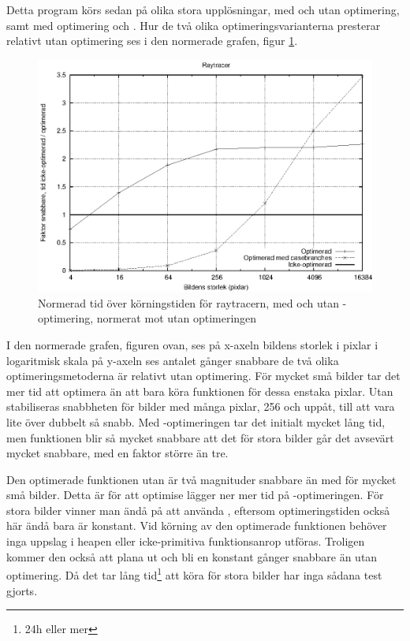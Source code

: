 \documentclass[Rapport]{subfiles}
\begin{document}
Detta program körs sedan på olika stora upplösningar, med och utan optimering,
samt med optimering och . Hur de två olika
optimeringsvarianterna presterar relativt utan optimering ses i 
den normerade grafen, figur \ref{fig:Resultat:shapes:normgraf}.

\begin{figure}[H]
\includegraphics{shapesnorm.eps}
\caption{Normerad tid över körningstiden för raytracern, med och utan
-optimering, normerat mot utan optimeringen}
\label{fig:Resultat:shapes:normgraf}
\end{figure}

I den normerade grafen, figuren ovan, ses
på x-axeln bildens storlek i pixlar i logaritmisk skala
på y-axeln ses antalet gånger snabbare de två olika optimeringsmetoderna är relativt
utan optimering. 
För mycket små bilder tar det mer tid att optimera än att bara köra
funktionen för dessa enstaka pixlar. Utan  stabiliseras
snabbheten för bilder med många pixlar, 256 och uppåt, till att vara lite över dubbelt
så snabb.
Med -optimeringen tar det initialt mycket lång tid, men funktionen blir
så mycket snabbare att det för stora bilder går det avsevärt mycket snabbare, med 
en faktor större än tre.

Den optimerade funktionen utan  är två magnituder snabbare
än med  för mycket små bilder. Detta är för att optimise
lägger ner mer tid på -optimeringen.
För stora bilder vinner man ändå på att använda , eftersom optimeringstiden
också här ändå bara är konstant. Vid körning av den optimerade funktionen
behöver inga uppslag i heapen eller icke-primitiva funktionsanrop utföras. 
Troligen kommer den också att plana
ut och bli en konstant gånger snabbare än utan optimering. Då det tar
lång tid\footnote{ 24h eller mer} att köra för stora bilder
har inga sådana test gjorts.
\end{document}
